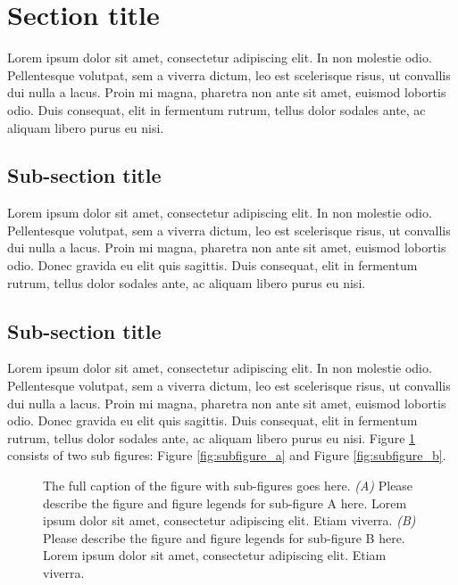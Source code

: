 \section{Section title}
Lorem ipsum dolor sit amet, consectetur adipiscing elit. In non molestie odio. Pellentesque volutpat, sem a viverra dictum, leo est scelerisque risus, ut convallis dui nulla a lacus. Proin mi magna, pharetra non ante sit amet, euismod lobortis odio. Duis consequat, elit in fermentum rutrum, tellus dolor sodales ante, ac aliquam libero purus eu nisi. 

\subsection{Sub-section title}
Lorem ipsum dolor sit amet, consectetur adipiscing elit. In non molestie odio. Pellentesque volutpat, sem a viverra dictum, leo est scelerisque risus, ut convallis dui nulla a lacus. Proin mi magna, pharetra non ante sit amet, euismod lobortis odio.  Donec gravida eu elit quis sagittis. Duis consequat, elit in fermentum rutrum, tellus dolor sodales ante, ac aliquam libero purus eu nisi. 

\subsection{Sub-section title}
Lorem ipsum dolor sit amet, consectetur adipiscing elit. In non molestie odio. Pellentesque volutpat, sem a viverra dictum, leo est scelerisque risus, ut convallis dui nulla a lacus. Proin mi magna, pharetra non ante sit amet, euismod lobortis odio. Donec gravida eu elit quis sagittis. Duis consequat, elit in fermentum rutrum, tellus dolor sodales ante, ac aliquam libero purus eu nisi.  Figure \ref{fig:main_figure} consists of two sub figures: Figure \ref{fig:subfigure_a} and Figure \ref{fig:subfigure_b}.     

\begin{figure}[tbh]
\centering
{}
\hfill
{}
\caption[The short caption of the figure with sub-figures goes here.]{The full caption of the figure with sub-figures goes here. \textit{(A)} Please describe the figure and figure legends for sub-figure A here. Lorem ipsum dolor sit amet, consectetur adipiscing elit. Etiam viverra. \textit{(B)} Please describe the figure and figure legends for sub-figure B here. Lorem ipsum dolor sit amet, consectetur adipiscing elit. Etiam viverra.}
\label{fig:main_figure}
\end{figure}

